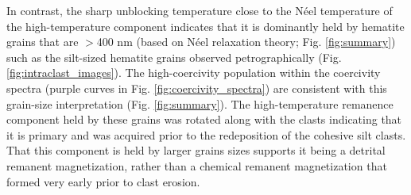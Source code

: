 \documentclass[draft]{agujournal2019}
\begin{document}
In contrast, the sharp unblocking temperature close to the N\'eel temperature of the high-temperature component indicates that it is dominantly held by hematite grains that are $>$400 nm (based on N\'eel relaxation theory; Fig. \ref{fig:summary}) such as the silt-sized hematite grains observed petrographically (Fig. \ref{fig:intraclast_images}). The high-coercivity population within the coercivity spectra (purple curves in Fig. \ref{fig:coercivity_spectra}) are consistent with this grain-size interpretation (Fig. \ref{fig:summary}). The high-temperature remanence component held by these grains was rotated along with the clasts indicating that it is primary and was acquired prior to the redeposition of the cohesive silt clasts. That this component is held by larger grains sizes supports it being a detrital remanent magnetization, rather than a chemical remanent magnetization that formed very early prior to clast erosion. 
\end{document}
